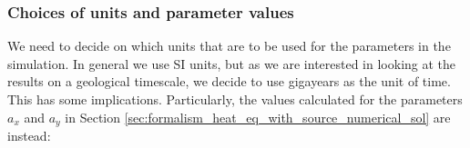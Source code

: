 \documentclass[reprint,english,notitlepage]{revtex4-1}  %
\begin{document}





\subsubsection{Choices of units and parameter values} \label{sec:formalism_heat_units_parameters}

We need to decide on which units that are to be used for the parameters in the simulation. In general we use SI units, but as we are interested in looking at the results on a geological timescale, we decide to use gigayears as the unit of time. This has some implications. Particularly, the values calculated for the parameters $a_x$ and $a_y$ in Section \ref{sec:formalism_heat_eq_with_source_numerical_sol} are instead:
\end{document}
